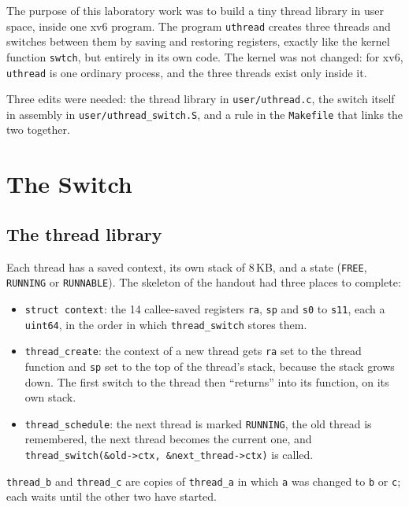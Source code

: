 \documentclass[12pt,a4paper]{article}
\begin{document}
The purpose of this laboratory work was to build a tiny thread library in user space, inside one xv6 program. The program \texttt{uthread} creates three threads and switches between them by saving and restoring registers, exactly like the kernel function \texttt{swtch}, but entirely in its own code. The kernel was not changed: for xv6, \texttt{uthread} is one ordinary process, and the three threads exist only inside it.

Three edits were needed: the thread library in \texttt{user/uthread.c}, the switch itself in assembly in \texttt{user/uthread\_switch.S}, and a rule in the \texttt{Makefile} that links the two together.

\newpage
\section{The Switch}

\subsection{The thread library}

Each thread has a saved context, its own stack of 8\,KB, and a state (\texttt{FREE}, \texttt{RUNNING} or \texttt{RUNNABLE}). The skeleton of the handout had three places to complete:

\begin{itemize}
  \item \texttt{struct context}: the 14 callee-saved registers \texttt{ra}, \texttt{sp} and \texttt{s0} to \texttt{s11}, each a \texttt{uint64}, in the order in which \texttt{thread\_switch} stores them.
  \item \texttt{thread\_create}: the context of a new thread gets \texttt{ra} set to the thread function and \texttt{sp} set to the top of the thread's stack, because the stack grows down. The first switch to the thread then ``returns'' into its function, on its own stack.
  \item \texttt{thread\_schedule}: the next thread is marked \texttt{RUNNING}, the old thread is remembered, the next thread becomes the current one, and \texttt{thread\_switch(\&old->ctx, \&next\_thread->ctx)} is called.
\end{itemize}

\texttt{thread\_b} and \texttt{thread\_c} are copies of \texttt{thread\_a} in which \texttt{a} was changed to \texttt{b} or \texttt{c}; each waits until the other two have started.


\end{document}
